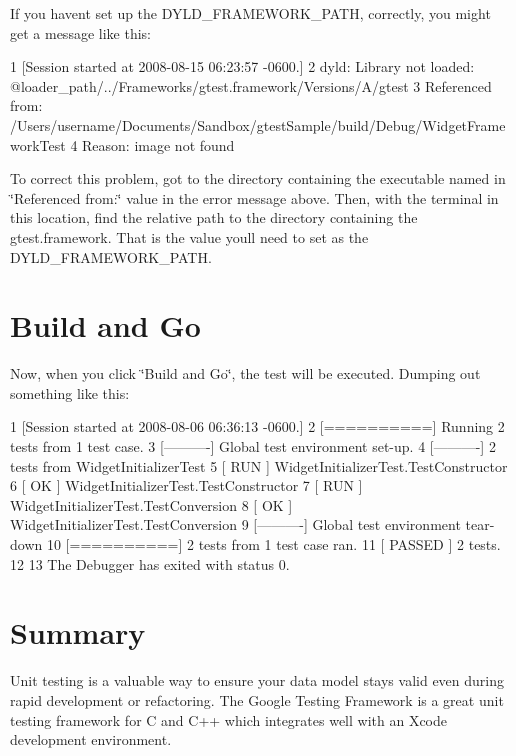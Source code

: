 If you haven\textquotesingle{}t set up the D\+Y\+L\+D\+\_\+\+F\+R\+A\+M\+E\+W\+O\+R\+K\+\_\+\+P\+A\+TH, correctly, you might get a message like this\+:


\begin{DoxyCode}
1 [Session started at 2008-08-15 06:23:57 -0600.]
2   dyld: Library not loaded: @loader\_path/../Frameworks/gtest.framework/Versions/A/gtest
3     Referenced from: /Users/username/Documents/Sandbox/gtestSample/build/Debug/WidgetFrameworkTest
4     Reason: image not found
\end{DoxyCode}


To correct this problem, got to the directory containing the executable named in \char`\"{}\+Referenced from\+:\char`\"{} value in the error message above. Then, with the terminal in this location, find the relative path to the directory containing the gtest.\+framework. That is the value you\textquotesingle{}ll need to set as the D\+Y\+L\+D\+\_\+\+F\+R\+A\+M\+E\+W\+O\+R\+K\+\_\+\+P\+A\+TH.

\section*{Build and Go}

Now, when you click \char`\"{}\+Build and Go\char`\"{}, the test will be executed. Dumping out something like this\+:


\begin{DoxyCode}
1 [Session started at 2008-08-06 06:36:13 -0600.]
2 [==========] Running 2 tests from 1 test case.
3 [----------] Global test environment set-up.
4 [----------] 2 tests from WidgetInitializerTest
5 [ RUN      ] WidgetInitializerTest.TestConstructor
6 [       OK ] WidgetInitializerTest.TestConstructor
7 [ RUN      ] WidgetInitializerTest.TestConversion
8 [       OK ] WidgetInitializerTest.TestConversion
9 [----------] Global test environment tear-down
10 [==========] 2 tests from 1 test case ran.
11 [  PASSED  ] 2 tests.
12 
13 The Debugger has exited with status 0.  
\end{DoxyCode}


\section*{Summary}

Unit testing is a valuable way to ensure your data model stays valid even during rapid development or refactoring. The Google Testing Framework is a great unit testing framework for C and C++ which integrates well with an Xcode development environment. 